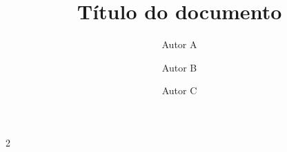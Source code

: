 \documentclass[a4paper,12pt]{article}
\title{Título do documento}
\author[1]{Autor A}
\author[1]{Autor B}
\author[1]{Autor C}
\affil[1]{Pós-graduação em Inteligência Artificial Aplicada, UniSENAI}
\date{}
\begin{document}
\maketitle

\begin{multicols*}{2}











\end{multicols*}
\end{document}
